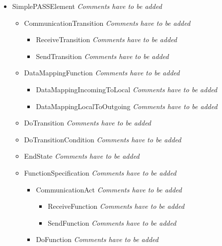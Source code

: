 \begin{itemize}
\item SimplePASSElement \linebreak \textit{Comments have to be added}
\begin{itemize}
	\item CommunicationTransition \linebreak \textit{Comments have to be added}
	\begin{itemize}
		\item ReceiveTransition \linebreak \textit{Comments have to be added}
		\item SendTransition \linebreak \textit{Comments have to be added}
	\end{itemize}
	\item DataMappingFunction \linebreak \textit{Comments have to be added}
	\begin{itemize}
		\item DataMappingIncomingToLocal \linebreak \textit{Comments have to be added}
		\item DataMappingLocalToOutgoing \linebreak \textit{Comments have to be added}
	\end{itemize}
	\item DoTransition \linebreak \textit{Comments have to be added}
	\item DoTransitionCondition \linebreak \textit{Comments have to be added}
	\item EndState \linebreak \textit{Comments have to be added}
	\item FunctionSpecification \linebreak \textit{Comments have to be added}
	\begin{itemize}
		\item CommunicationAct \linebreak \textit{Comments have to be added}
		\begin{itemize}
			\item ReceiveFunction \linebreak \textit{Comments have to be added}
			\item SendFunction \linebreak \textit{Comments have to be added}
		\end{itemize}
		\item DoFunction \linebreak \textit{Comments have to be added}

\end{itemize}
\end{itemize}
\end{itemize}
